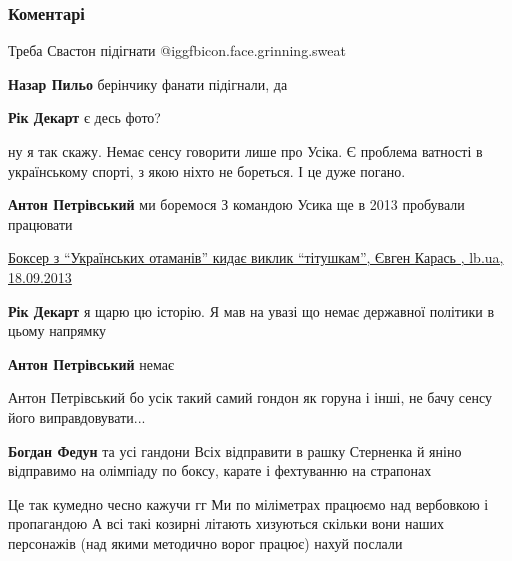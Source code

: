  
 
 
 
 
\subsubsection{Коментарі}

\begin{itemize} %
Треба Свастон підігнати @igg{fbicon.face.grinning.sweat} 

\begin{itemize} %
\textbf{Назар Пильо} берінчику фанати підігнали, да

\textbf{Рік Декарт} є десь фото?
\end{itemize} %


ну я так скажу. Немає сенсу говорити лише про Усіка. Є проблема ватності в
українському спорті, з якою ніхто не бореться. І це дуже погано.

\begin{itemize} %
\textbf{Антон Петрівський} ми боремося
З командою Усика ще в 2013 пробували працювати

\href{https://lb.ua/blog/evgen_karas/227414_sportsmeni_ukraini_naymantsi_vladi.html}{%
Боксер з \enquote{Українських отаманів} кидає виклик \enquote{тітушкам}, Євген Карась , lb.ua, 18.09.2013%
}

\textbf{Рік Декарт} я щарю цю історію. Я мав на увазі що немає державної політики в цьому напрямку

\textbf{Антон Петрівський} немає

Антон Петрівський бо усік такий самий гондон як горуна і інші, не бачу сенсу його виправдовувати...

\textbf{Богдан Федун} та усі гандони
Всіх відправити в рашку
Стерненка й яніно відправимо на олімпіаду по боксу, карате і фехтуванню на страпонах

Це так кумедно чесно кажучи гг
Ми по міліметрах працюємо над вербовкою і пропагандою
А всі такі козирні літають хизуються скільки вони наших персонажів (над якими методично ворог працює) нахуй послали


\end{itemize}
\end{itemize}
